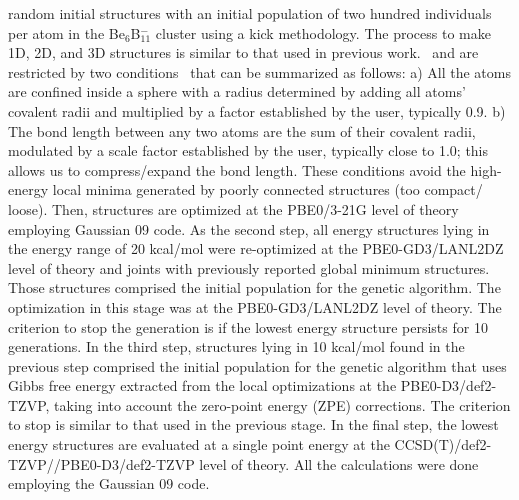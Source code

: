 \documentclass[prb,aps,preprint,showkeys,showpacs]{revtex4}
\begin{document}
random initial structures with an initial population of two hundred individuals per atom in the Be$_{6}$B$_{11}^{-}$ cluster using a kick methodology. The process to make 1D, 2D, and 3D structures is similar to that used in previous work.~\cite{Grande-Aztatzi,Osvaldo} and are restricted by two conditions~\cite{Grande-Aztatzi} that can be summarized as follows: a) All the atoms are confined inside a sphere with a radius determined by adding all atoms' covalent radii and multiplied by a factor established by the user, typically 0.9. b) The bond length between any two atoms are the sum of their covalent radii, modulated by a scale factor established by the user, typically close to 1.0; this allows us to compress/expand the bond length. These conditions avoid the high-energy local minima generated by poorly connected structures (too compact/ loose). Then, structures are optimized at the PBE0/3-21G level of theory employing Gaussian 09 code. As the second step, all energy structures lying in the energy range of 20 kcal/mol were re-optimized at the PBE0-GD3/LANL2DZ level of theory and joints with previously reported global minimum structures. Those structures comprised the initial population for the genetic algorithm. The optimization in this stage was at the PBE0-GD3/LANL2DZ level of theory. The criterion to stop the generation is if the lowest energy structure persists for 10 generations. In the third step, structures lying in 10 kcal/mol found in the previous step comprised the initial population for the genetic algorithm that uses Gibbs free energy extracted from the local optimizations at the PBE0-D3/def2-TZVP, taking into account the zero-point energy (ZPE) corrections. The criterion to stop is similar to that used in the previous stage. In the final step, the lowest energy structures are evaluated at a single point energy at the CCSD(T)/def2-TZVP//PBE0-D3/def2-TZVP level of theory. All the calculations were done employing the Gaussian 09 code.~\cite{gauss}
\end{document}
